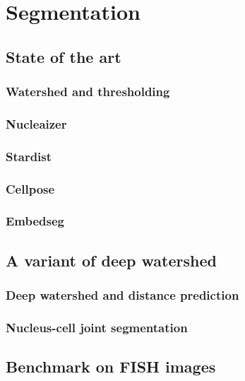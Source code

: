 
\graphicspath{{../../figures/chapter_3/}}


\chapter{Segmentation} \label{ch:chapter3}
\minitoc
\newpage


\section{State of the art}


\subsection{Watershed and thresholding}

\subsection{Nucleaizer}

\subsection{Stardist}

\subsection{Cellpose}

\subsection{Embedseg}


\section{A variant of deep watershed}


\subsection{Deep watershed and distance prediction}

\subsection{Nucleus-cell joint segmentation}


\section{Benchmark on \ac{FISH} images}


